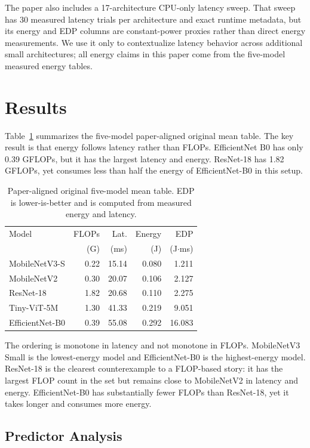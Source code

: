 \documentclass[conference]{IEEEtran}
\begin{document}
The paper also includes a 17-architecture CPU-only latency sweep. That sweep
has 30 measured latency trials per architecture and exact runtime metadata,
but its energy and EDP columns are constant-power proxies rather than direct
energy measurements. We use it only to contextualize latency behavior across
additional small architectures; all energy claims in this paper come from
the five-model measured energy tables.

\section{Results}

Table~\ref{tab:primary} summarizes the five-model paper-aligned original
mean table.
The key result is that energy follows latency rather than FLOPs. EfficientNet
B0 has only 0.39 GFLOPs, but it has the largest latency and energy. ResNet-18
has 1.82 GFLOPs, yet consumes less than half the energy of EfficientNet-B0 in
this setup.

\begin{table}[t]
\centering
\caption{Paper-aligned original five-model mean table. EDP is
lower-is-better and is computed from measured energy and latency.}
\label{tab:primary}
\small
\begin{tabular}{lrrrr}
\toprule
Model & FLOPs & Lat. & Energy & EDP\\
 & (G) & (ms) & (J) & (J$\cdot$ms)\\
\midrule
MobileNetV3-S & 0.22 & 15.14 & 0.080 & 1.211\\
MobileNetV2 & 0.30 & 20.07 & 0.106 & 2.127\\
ResNet-18 & 1.82 & 20.68 & 0.110 & 2.275\\
Tiny-ViT-5M & 1.30 & 41.33 & 0.219 & 9.051\\
EfficientNet-B0 & 0.39 & 55.08 & 0.292 & 16.083\\
\bottomrule
\end{tabular}
\end{table}

The ordering is monotone in latency and not monotone in FLOPs. MobileNetV3
Small is the lowest-energy model and EfficientNet-B0 is the highest-energy
model. ResNet-18 is the clearest counterexample to a FLOP-based story: it has
the largest FLOP count in the set but remains close to MobileNetV2 in latency
and energy. EfficientNet-B0 has substantially fewer FLOPs than ResNet-18, yet
it takes longer and consumes more energy.

\subsection{Predictor Analysis}
\end{document}
